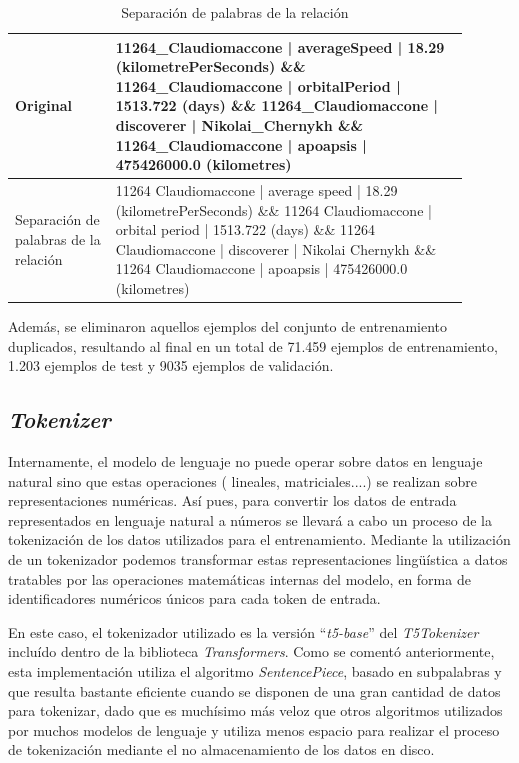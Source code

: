 \begin{itemize}
    
    \begin{table}[h!]
    \begin{center}
    \begin{tabular}{p{0.2\linewidth} | p{0.7\linewidth}}
    Original & 11264\_Claudiomaccone | \textcolor{codepurple}{averageSpeed} | 18.29 (kilometrePerSeconds) \&\& 11264\_Claudiomaccone | \textcolor{codepurple}{orbitalPeriod} | 1513.722 (days) \&\& 11264\_Claudiomaccone | discoverer | Nikolai\_Chernykh \&\& 11264\_Claudiomaccone | apoapsis | 475426000.0 (kilometres)\\ \hline
    Separación de palabras de la relación & 11264 Claudiomaccone | average speed | 18.29 (kilometrePerSeconds) \&\& 11264 Claudiomaccone | orbital period | 1513.722 (days) \&\& 11264 Claudiomaccone | discoverer | Nikolai Chernykh \&\& 11264 Claudiomaccone | apoapsis | 475426000.0 (kilometres) \\
    \end{tabular}
    \caption{Separación de palabras de la relación}
    \label{tab:clean_separar}
    \end{center}
    \end{table}
    
\end{itemize}

Además, se eliminaron aquellos ejemplos del conjunto de entrenamiento duplicados, resultando al final en un total de 71.459 ejemplos de entrenamiento, 1.203 ejemplos de test y 9035 ejemplos de validación.

\subsection{\textit{Tokenizer}}
\label{sec:tokenizador}
Internamente, el modelo de lenguaje no puede operar sobre datos en lenguaje natural sino que estas operaciones ( lineales, matriciales....) se realizan sobre representaciones numéricas. Así pues, para convertir los datos de entrada representados en lenguaje natural a números se llevará a cabo un proceso de la tokenización de los datos utilizados para el entrenamiento. Mediante la utilización de un tokenizador podemos transformar estas representaciones lingüística a datos tratables por las operaciones matemáticas internas del modelo, en forma de identificadores numéricos únicos para cada token de entrada.

En este caso, el tokenizador utilizado es la versión ``\textit{t5-base}'' del \textit{T5Tokenizer} incluído dentro de la biblioteca \textit{Transformers}. Como se comentó anteriormente, esta implementación utiliza el algoritmo \textit{SentencePiece}, basado en subpalabras y que resulta bastante eficiente cuando se disponen de una gran cantidad de datos para tokenizar, dado que es muchísimo más veloz que otros algoritmos utilizados por muchos modelos de lenguaje y utiliza menos espacio para realizar el proceso de tokenización mediante el no almacenamiento de los datos en disco.

